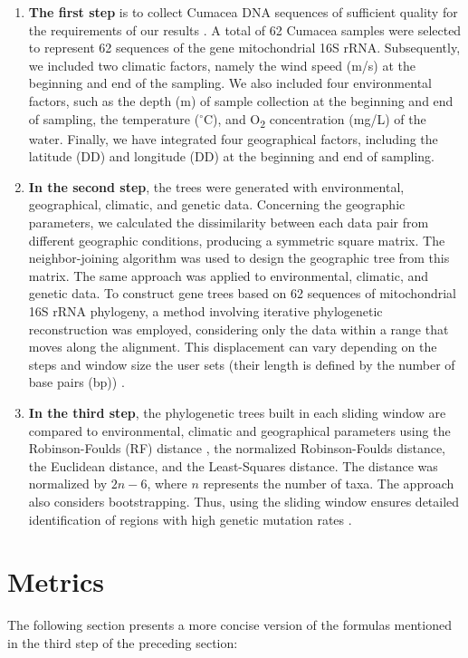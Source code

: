 \begin{enumerate}
\item \textbf{The first step} is to collect Cumacea DNA sequences of sufficient quality for the requirements of our results \citep{koshkarov_phylogeography_2022}. A total of 62 Cumacea samples were selected to represent 62 sequences of the gene mitochondrial 16S rRNA. Subsequently, we included two climatic factors, namely the wind speed (m/s) at the beginning and end of the sampling. We also included four environmental factors, such as the depth (m) of sample collection at the beginning and end of sampling, the temperature ($^\circ$C), and O\textsubscript{2} concentration (mg/L) of the water. Finally, we have integrated four geographical factors, including the latitude (DD) and longitude (DD) at the beginning and end of sampling.

\item \textbf{In the second step}, the trees were generated with environmental, geographical, climatic, and genetic data. Concerning the geographic parameters, we calculated the dissimilarity between each data pair from different geographic conditions, producing a symmetric square matrix. The neighbor-joining algorithm was used to design the geographic tree from this matrix. The same approach was applied to environmental, climatic, and genetic data. To construct gene trees based on 62 sequences of mitochondrial 16S rRNA phylogeny, a method involving iterative phylogenetic reconstruction was employed, considering only the data within a range that moves along the alignment. This displacement can vary depending on the steps and window size the user sets (their length is defined by the number of base pairs (bp)) \citep{koshkarov_phylogeography_2022}.

\item \textbf{In the third step}, the phylogenetic trees built in each sliding window are compared to environmental, climatic and geographical parameters using the Robinson-Foulds (RF) distance \citep{robinson_comparison_1981, koshkarov_phylogeography_2022}, the normalized Robinson-Foulds distance, the Euclidean distance, and the Least-Squares distance. The distance was normalized by $2n-6$, where $n$ represents the number of taxa. The approach also considers bootstrapping. Thus, using the sliding window ensures detailed identification of regions with high genetic mutation rates \citep{koshkarov_phylogeography_2022}.
\end{enumerate}

\section{Metrics}\label{metrics}
The following section presents a more concise version of the formulas mentioned in the third step of the preceding section:


